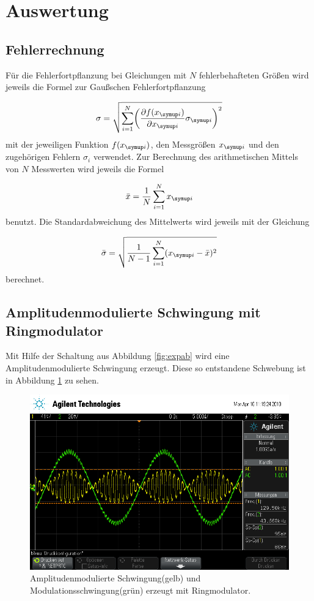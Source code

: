 \section{Auswertung}
\label{sec:Auswertung}

\subsection{Fehlerrechnung}

Für die Fehlerfortpflanzung bei Gleichungen mit $N$ fehlerbehafteten Größen
wird jeweils die Formel zur Gaußschen Fehlerfortpflanzung

\begin{equation*}
  \sigma = \sqrt{\sum_{i=1}^{N}\biggl(\frac{\partial f(x_{\g{i}})}{\partial x_{\g{i}}}
  \sigma_{\g{i}}\biggr)^2}
\end{equation*}
mit der jeweiligen Funktion $f(x_{\g{i}})$, den Messgrößen $x_{\g{i}}$ und den
zugehörigen Fehlern $\sigma_i$ verwendet.
Zur Berechnung des arithmetischen Mittels von $N$ Messwerten wird jeweils die
Formel

\begin{equation*}
  \bar{x} = \frac{1}{N}\sum_{i=1}^{N}x_{\g{i}}
\end{equation*}
benutzt.
Die Standardabweichung des Mittelwerts wird jeweils mit der Gleichung

\begin{equation*}
  \bar{\sigma} = \sqrt{\frac{1}{N-1}\sum_{i=1}^{N}(x_{\g{i}} - \bar{x})^2}
\end{equation*}
berechnet.

\listoftodos

\subsection{Amplitudenmodulierte Schwingung mit Ringmodulator}

Mit Hilfe der Schaltung aus Abbildung \ref{fig:expab} wird eine Amplitudenmodulierte Schwingung erzeugt.
Diese so entstandene Schwebung ist in Abbildung \ref{fig:amplModOszi} zu sehen.

\begin{figure}[h]
  \centering
  \includegraphics[width=.9\textwidth]{Oszi_Pics/amplModRing.png}
  \caption{Amplitudenmodulierte Schwingung(gelb) und Modulationsschwingung(grün) erzeugt mit Ringmodulator.}
  \label{fig:amplModOszi}
\end{figure}

